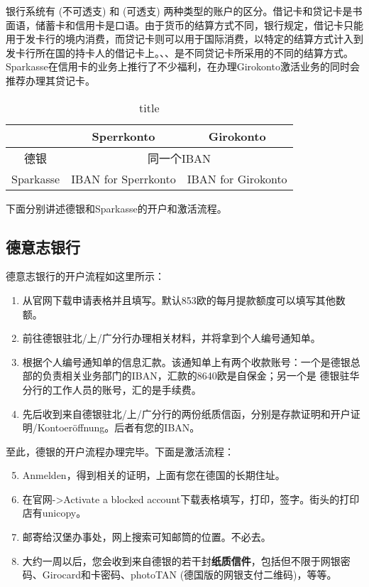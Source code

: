     银行系统有 (不可透支) 和 (可透支) 两种类型的账户的区分。借记卡和贷记卡是书面语，储蓄卡和信用卡是口语。由于货币的结算方式不同，银行规定，借记卡只能用于发卡行的境内消费，而贷记卡则可以用于国际消费，以特定的结算方式计入到发卡行所在国的持卡人的借记卡上。、、是不同贷记卡所采用的不同的结算方式。Sparkasse在信用卡的业务上推行了不少福利，在办理Girokonto激活业务的同时会推荐办理其贷记卡。

    \begin{table}[h]
      \centering
      \caption{title}
      \begin{tabular}{|c|c|c|}
      \hline
      &Sperrkonto&Girokonto\\
      \hline
      德银&\multicolumn{2}{c|}{同一个IBAN}\\
      \hline
      Sparkasse&IBAN for Sperrkonto&IBAN for Girokonto\\
      \hline
      \end{tabular}
    \end{table}

    下面分别讲述德银和Sparkasse的开户和激活流程。

  \subsection{德意志银行}

    德意志银行的开户流程如这里所示：

    \begin{enumerate}
      \item 从官网下载申请表格并且填写。默认853欧的每月提款额度可以填写其他数额。
      \item 前往德银驻北/上/广分行办理相关材料，并将拿到个人编号通知单。
      \item 根据个人编号通知单的信息汇款。该通知单上有两个收款账号：一个是德银总部的负责相关业务部门的IBAN，汇款的8640欧是自保金；另一个是 德银驻华分行的工作人员的账号，汇的是手续费。
      \item 先后收到来自德银驻北/上/广分行的两份纸质信函，分别是存款证明和开户证明/Kontoeröffnung。后者有您的IBAN。
    \end{enumerate}

    至此，德银的开户流程办理完毕。下面是激活流程：

    \begin{enumerate}
      \setcounter{enumi}{4}
      \item Anmelden，得到相关的证明，上面有您在德国的长期住址。
      \item 在官网->Activate a blocked account下载表格填写，打印，签字。街头的打印店有unicopy。
      \item 邮寄给汉堡办事处，网上搜索可知邮筒的位置。不必去。
      \item 大约一周以后，您会收到来自德银的若干封\textbf{纸质信件}，包括但不限于网银密码、Girocard和卡密码、photoTAN (德国版的网银支付二维码)，等等。
    \end{enumerate}

